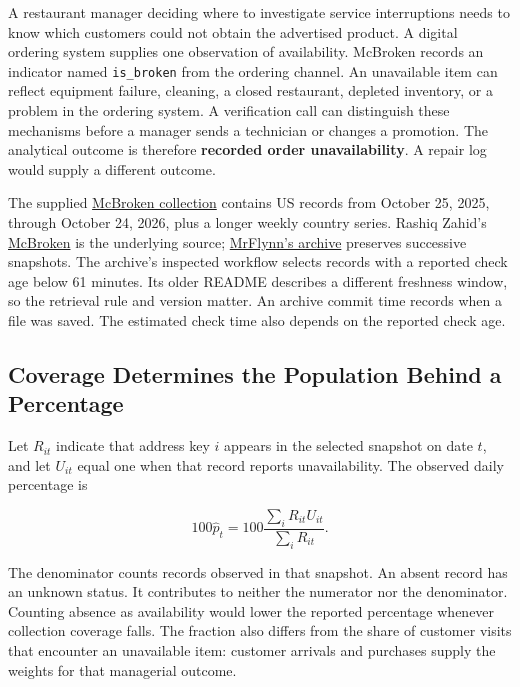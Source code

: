 \noindent \noindent A restaurant manager deciding where to investigate service
interruptions needs to know which customers could not obtain the
advertised product. A digital ordering system supplies one observation
of availability. McBroken records an indicator named \texttt{is\_broken}
from the ordering channel. An unavailable item can reflect equipment
failure, cleaning, a closed restaurant, depleted inventory, or a problem
in the ordering system. A verification call can distinguish these
mechanisms before a manager sends a technician or changes a promotion.
The analytical outcome is therefore \textbf{recorded order
unavailability}. A repair log would supply a different outcome.

The supplied
\href{../01_Resources/02_M2_Customer_Data_and_Visualization/mcbroken_api_lab/README.md}{McBroken
collection} contains US records from October 25, 2025, through October
24, 2026, plus a longer weekly country series. Rashiq Zahid's
\href{https://mcbroken.com/}{McBroken} is the underlying source;
\href{https://github.com/MrFlynn/mcbroken-archive}{MrFlynn's archive}
preserves successive snapshots. The archive's inspected workflow selects
records with a reported check age below 61 minutes. Its older README
describes a different freshness window, so the retrieval rule and
version matter. An archive commit time records when a file was saved.
The estimated check time also depends on the reported check age.

\hypertarget{M02-coverage-determines-the-population-behind-a-percentage}{%
\subsection{Coverage Determines the Population Behind a
Percentage}\label{M02-coverage-determines-the-population-behind-a-percentage}}

\noindent \noindent Let \(R_{it}\) indicate that address key \(i\) appears in the
selected snapshot on date \(t\), and let \(U_{it}\) equal one when that
record reports unavailability. The observed daily percentage is

\[
100\widehat p_t=100\frac{\sum_i R_{it}U_{it}}{\sum_i R_{it}}.
\]

The denominator counts records observed in that snapshot. An absent
record has an unknown status. It contributes to neither the numerator
nor the denominator. Counting absence as availability would lower the
reported percentage whenever collection coverage falls. The fraction
also differs from the share of customer visits that encounter an
unavailable item: customer arrivals and purchases supply the weights for
that managerial outcome.

